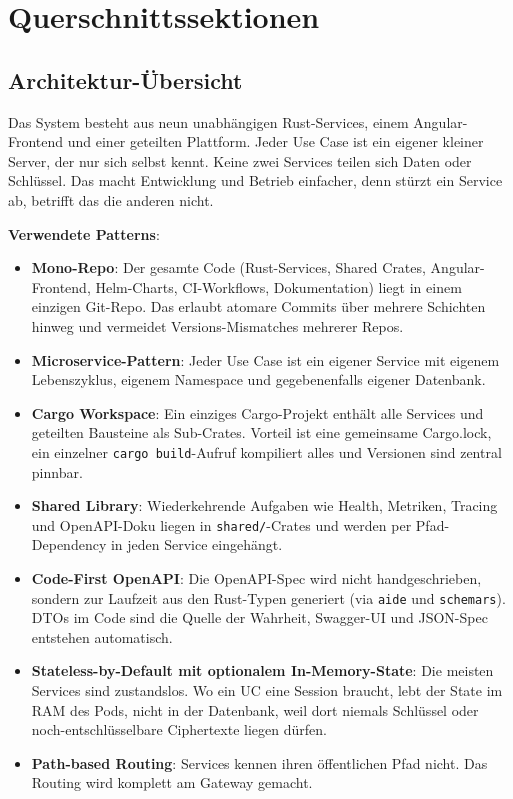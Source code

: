 \section{Querschnittssektionen}
\label{sec:querschnittssektionen}

\subsection{Architektur-Übersicht}
\label{sub:architektur_uebersicht}

Das System besteht aus neun unabhängigen Rust-Services, einem Angular-Frontend und einer geteilten Plattform. Jeder Use Case ist ein eigener kleiner Server, der nur sich selbst kennt. Keine zwei Services teilen sich Daten oder Schlüssel. Das macht Entwicklung und Betrieb einfacher, denn stürzt ein Service ab, betrifft das die anderen nicht.

\textbf{Verwendete Patterns}:
\begin{itemize}
    \item \textbf{Mono-Repo}: Der gesamte Code (Rust-Services, Shared Crates, Angular-Frontend, Helm-Charts, CI-Workflows, Dokumentation) liegt in einem einzigen Git-Repo. Das erlaubt atomare Commits über mehrere Schichten hinweg und vermeidet Versions-Mismatches mehrerer Repos.
    \item \textbf{Microservice-Pattern}: Jeder Use Case ist ein eigener Service mit eigenem Lebenszyklus, eigenem Namespace und gegebenenfalls eigener Datenbank.
    \item \textbf{Cargo Workspace}: Ein einziges Cargo-Projekt enthält alle Services und geteilten Bausteine als Sub-Crates. Vorteil ist eine gemeinsame Cargo.lock, ein einzelner \verb|cargo build|-Aufruf kompiliert alles und Versionen sind zentral pinnbar.
    \item \textbf{Shared Library}: Wiederkehrende Aufgaben wie Health, Metriken, Tracing und OpenAPI-Doku liegen in \verb|shared/|-Crates und werden per Pfad-Dependency in jeden Service eingehängt.
    \item \textbf{Code-First OpenAPI}: Die OpenAPI-Spec wird nicht handgeschrieben, sondern zur Laufzeit aus den Rust-Typen generiert (via \verb|aide| und \verb|schemars|). DTOs im Code sind die Quelle der Wahrheit, Swagger-UI und JSON-Spec entstehen automatisch.
    \item \textbf{Stateless-by-Default mit optionalem In-Memory-State}: Die meisten Services sind zustandslos. Wo ein UC eine Session braucht, lebt der State im RAM des Pods, nicht in der Datenbank, weil dort niemals Schlüssel oder noch-entschlüsselbare Ciphertexte liegen dürfen.
    \item \textbf{Path-based Routing}: Services kennen ihren öffentlichen Pfad nicht. Das Routing wird komplett am Gateway gemacht.
\end{itemize}

